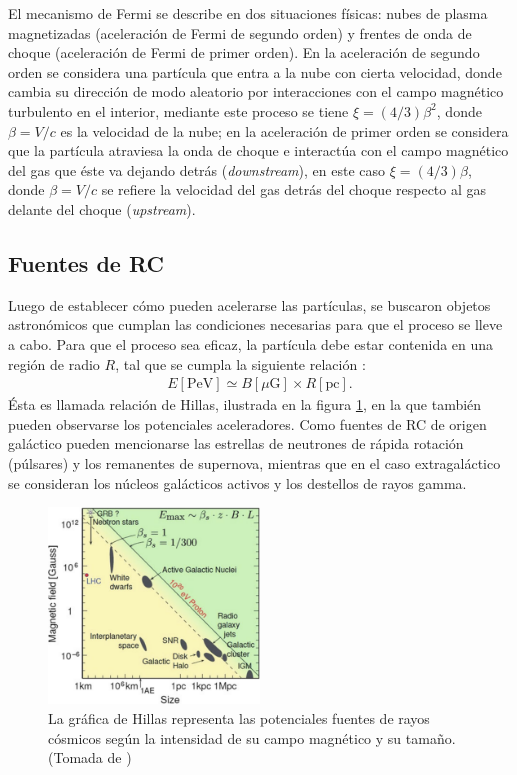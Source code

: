 	El mecanismo de Fermi se describe en dos situaciones físicas: nubes de plasma magnetizadas (aceleración de Fermi de segundo orden) y frentes de onda de choque (aceleración de Fermi de primer orden). En la aceleración de segundo orden se considera una partícula que entra a la nube con cierta velocidad, donde cambia su dirección de modo aleatorio por interacciones con el campo magnético turbulento en el interior, mediante este proceso se tiene $\xi=(4/3) \beta^2$, donde $\beta= V/c$ es la velocidad de la nube; en la aceleración de primer orden se considera que la partícula atraviesa la onda de choque e interactúa con el campo magnético del gas que éste va dejando detrás (\textit{downstream}), en este caso $\xi=(4/3) \beta$, donde $\beta= V/c$ se refiere la velocidad del gas detrás del choque respecto al gas delante del choque (\textit{upstream}).
	
	\subsection{Fuentes de RC}
	Luego de establecer cómo pueden acelerarse las partículas, se buscaron objetos astronómicos que cumplan las condiciones necesarias para que el proceso se lleve a cabo. Para que el proceso sea eficaz, la partícula debe estar contenida en una región de radio $R$, tal que se cumpla la siguiente relación \cite{DeAngelis2015}:	
	\begin{align}
	E[\text{PeV}] \simeq B[\mu\text{G}]\times R[\text{pc}].
	\end{align}
	Ésta es llamada relación de Hillas, ilustrada en la figura \ref{fig:Hillas}, en la que también pueden observarse los potenciales aceleradores. Como fuentes de RC de origen galáctico pueden mencionarse las estrellas de neutrones de rápida rotación (púlsares) y los remanentes de supernova, mientras que en el caso extragaláctico se consideran los núcleos galácticos activos y los destellos de rayos gamma.
	
	\begin{figure}[h]
	\centering	
	\includegraphics[width=0.5\textwidth]{Figuras/Hillas_Relation} 
	\caption{La gráfica de Hillas representa las potenciales fuentes de rayos cósmicos según la intensidad de su campo magnético y su tamaño. (Tomada de \cite{DeAngelis2015})}
	\label{fig:Hillas}
	\end{figure}	

